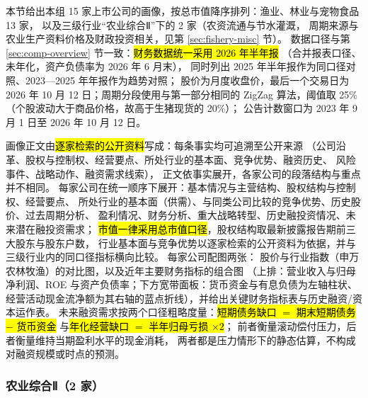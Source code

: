 本节给出本组 \num{15} 家上市公司的画像，按总市值降序排列：渔业、林业与宠物食品 \num{13} 家，
以及三级行业“农业综合Ⅱ”下的 \num{2} 家（农资流通与节水灌溉，
周期来源与农业生产资料价格及财政投资相关，见第 \ref{sec:fishery-misc} 节）。
数据口径与第 \ref{sec:comp-overview} 节一致：\hl{财务数据统一采用 2026 年半年报}
（合并报表口径、未年化，资产负债率为 2026 年 6 月末），
同时列出 2025 年半年报作为同口径对照、2023---2025 年年报作为趋势对照；
股价为月度收盘价，最后一个交易日为 2026 年 10 月 12 日；周期分段使用与第一部分相同的
ZigZag 算法，阈值取 25\%（个股波动大于商品价格，故高于生猪现货的 20\%）；
公告计数窗口为 2023 年 9 月 1 日至 2026 年 10 月 12 日。

画像正文由\hl{逐家检索的公开资料}写成：每条事实均可追溯至公开来源
（公司沿革、股权与控制权、经营要点、所处行业的基本面、竞争优势、融资历史、
风险事件、战略动作、融资需求线索），
正文依事实展开，各家公司的段落结构与重点并不相同。
每家公司在统一顺序下展开：基本情况与主营结构、股权结构与控制权、经营要点、
所处行业的基本面（供需）、与同类公司比较的竞争优势、历史股价、过去周期分析、
盈利情况、财务分析、重大战略转型、历史融投资情况、未来潜在融投资需求；
\hl{市值一律采用总市值口径}，股权结构取最新披露报告期前三大股东与股东户数，
行业基本面与竞争优势以逐家检索的公开资料为依据，并与三级行业内的同口径指标横向比较。
每家公司配图两张：
股价与行业指数（申万农林牧渔）的对比图，以及近年主要财务指标的组合图
（上排：营业收入与归母净利润、ROE 与资产负债率；下方宽带面板：货币资金与有息负债为左轴柱状、
经营活动现金流净额为其右轴的蓝点折线），并给出关键财务指标表与历史融资/资本运作表。
未来融资需求按两个口径粗略度量：\hl{短期债务缺口 $=$ 期末短期债务 $-$ 货币资金}
与\hl{年化经营缺口 $=$ 半年归母亏损 $\times 2$}；
前者衡量滚动偿付压力，后者衡量维持当期盈利水平的现金消耗，
两者都是压力情形下的静态估算，不构成对融资规模或时点的预测。



\subsubsection*{农业综合Ⅱ（2 家）}



